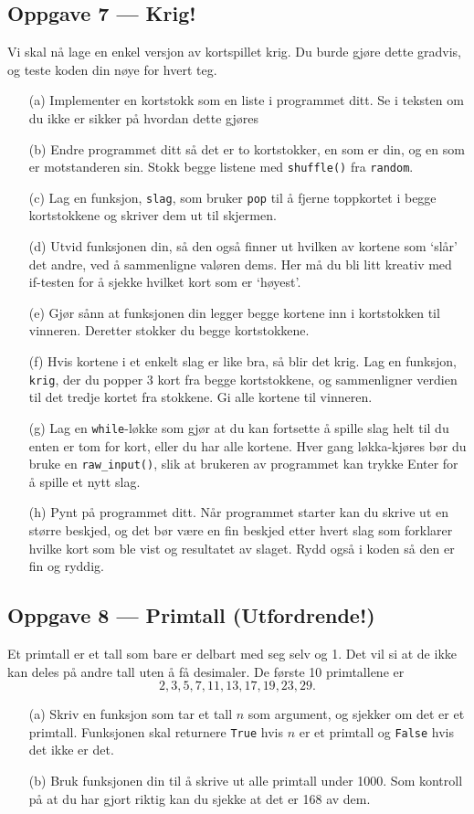 \documentclass[a4paper, 11pt, notitlepage]{article}
\begin{document}
\subsection*{Oppgave 7 --- Krig!}
Vi skal nå lage en enkel versjon av kortspillet krig. Du burde gjøre dette gradvis, og teste koden din nøye for hvert teg.
\begin{itemize}
\item[(a)] Implementer en kortstokk som en liste i programmet ditt. Se i teksten om du ikke er sikker på hvordan dette gjøres
\item[(b)] Endre programmet ditt så det er to kortstokker, en som er din, og en som er motstanderen sin. Stokk begge listene med \verb+shuffle()+ fra \verb+random+.
\item[(c)] Lag en funksjon, \verb+slag+, som bruker \verb+pop+ til å fjerne toppkortet i begge kortstokkene og skriver dem ut til skjermen.
\item[(d)] Utvid funksjonen din, så den også finner ut hvilken av kortene som `slår' det andre, ved å sammenligne valøren dems. Her må du bli litt kreativ med if-testen for å sjekke hvilket kort som er `høyest'. 
\item[(e)] Gjør sånn at funksjonen din legger begge kortene inn i kortstokken til vinneren. Deretter stokker du begge kortstokkene. 
\item[(f)] Hvis kortene i et enkelt slag er like bra, så blir det krig. Lag en funksjon, \verb+krig+, der du popper 3 kort fra begge kortstokkene, og sammenligner verdien til det tredje kortet fra stokkene. Gi alle kortene til vinneren.
\item[(g)] Lag en \verb+while+-løkke som gjør at du kan fortsette å spille slag helt til du enten er tom for kort, eller du har alle kortene. Hver gang løkka-kjøres bør du bruke en \verb+raw_input()+, slik at brukeren av programmet kan trykke Enter for å spille et nytt slag. 
\item[(h)] Pynt på programmet ditt. Når programmet starter kan du skrive ut en større beskjed, og det bør være en fin beskjed etter hvert slag som forklarer hvilke kort som ble vist og resultatet av slaget. Rydd også i koden så den er fin og ryddig. 
\end{itemize}

\subsection*{Oppgave 8 --- Primtall (Utfordrende!)}
Et primtall er et tall som bare er delbart med seg selv og 1. Det vil si at de ikke kan deles på andre tall uten å få desimaler. De første 10 primtallene er
$$2, 3, 5, 7, 11, 13, 17, 19, 23, 29.$$
\begin{itemize}
	\item[(a)] Skriv en funksjon som tar et tall $n$ som argument, og sjekker om det er et primtall. Funksjonen skal returnere \verb+True+ hvis $n$ er et primtall og \verb+False+ hvis det ikke er det.
	\item[(b)] Bruk funksjonen din til å skrive ut alle primtall under 1000. Som kontroll på at du har gjort riktig kan du sjekke at det er 168 av dem.
\end{itemize}
\end{document}
